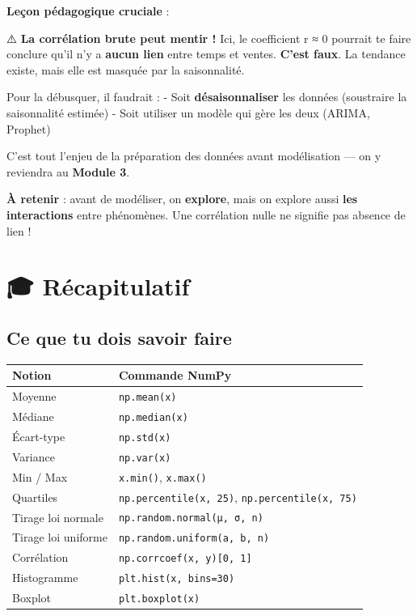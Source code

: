 \documentclass[
  french,
  11pt,
  a4paper,
]{scrbook}
\newcounter{none} %
\begin{document}
\begin{tcolorbox}
\textbf{Leçon pédagogique cruciale} :

⚠️ \textbf{La corrélation brute peut mentir !} Ici, le coefficient r ≈ 0
pourrait te faire conclure qu'il n'y a \textbf{aucun lien} entre temps
et ventes. \textbf{C'est faux}. La tendance existe, mais elle est
masquée par la saisonnalité.

Pour la débusquer, il faudrait : - Soit \textbf{désaisonnaliser} les
données (soustraire la saisonnalité estimée) - Soit utiliser un modèle
qui gère les deux (ARIMA, Prophet)

C'est tout l'enjeu de la préparation des données avant modélisation ---
on y reviendra au \textbf{Module 3}.

\textbf{À retenir} : avant de modéliser, on \textbf{explore}, mais on
explore aussi \textbf{les interactions} entre phénomènes. Une
corrélation nulle ne signifie pas absence de lien !

\end{tcolorbox}

\chapter{🎓 Récapitulatif}\label{ruxe9capitulatif-2}

\section{Ce que tu dois savoir
faire}\label{ce-que-tu-dois-savoir-faire-2}

{\def\LTcaptype{none} %
\begin{longtable}[]{@{}ll@{}}
\toprule\noalign{}
Notion & Commande NumPy \\
\midrule\noalign{}
\endhead
\bottomrule\noalign{}
\endlastfoot
Moyenne & \texttt{np.mean(x)} \\
Médiane & \texttt{np.median(x)} \\
Écart-type & \texttt{np.std(x)} \\
Variance & \texttt{np.var(x)} \\
Min / Max & \texttt{x.min()}, \texttt{x.max()} \\
Quartiles & \texttt{np.percentile(x,\ 25)},
\texttt{np.percentile(x,\ 75)} \\
Tirage loi normale & \texttt{np.random.normal(μ,\ σ,\ n)} \\
Tirage loi uniforme & \texttt{np.random.uniform(a,\ b,\ n)} \\
Corrélation & \texttt{np.corrcoef(x,\ y){[}0,\ 1{]}} \\
Histogramme & \texttt{plt.hist(x,\ bins=30)} \\
Boxplot & \texttt{plt.boxplot(x)} \\
\end{longtable}
}
\end{document}
